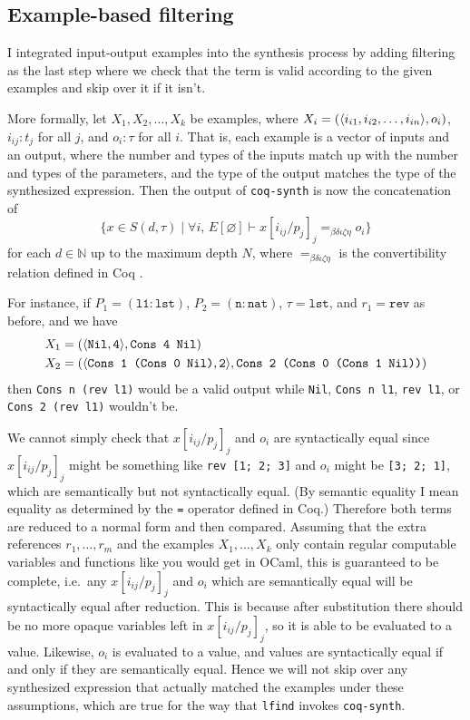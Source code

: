 \documentclass[11pt]{article}
\newcommand{\N}{\mathbb{N}}
\newcommand{\coq}[1]{\texttt{#1}}
\DeclarePairedDelimiter{\vect}{\langle}{\rangle}
\begin{document}
\subsection{Example-based filtering}

I integrated input-output examples into the synthesis process by adding filtering as the last step where we check that the term is valid according to the given examples and skip over it if it isn't.

More formally, let $X_1, X_2, \dots, X_k$ be examples, where $X_i = (\vect{i_{i1}, i_{i2}, \dots, i_{in}}, o_i)$, $i_{ij} : t_j$ for all $j$, and $o_i : \tau$ for all $i$. That is, each example is a vector of inputs and an output, where the number and types of the inputs match up with the number and types of the parameters, and the type of the output matches the type of the synthesized expression. Then the output of \texttt{coq-synth} is now the concatenation of
\[\{x \in S(d, \tau) \mid \forall i,\,E[\varnothing] \vdash x[i_{ij}/p_j]_j =_{\beta\delta\iota\zeta\eta} o_i\}\]
for each $d \in \N$ up to the maximum depth $N$, where $=_{\beta\delta\iota\zeta\eta}$ is the convertibility relation defined in Coq \cite{conversion}.

For instance, if $P_1 = (\coq{l1} : \coq{lst})$, $P_2 = (\coq{n} : \coq{nat})$, $\tau = \coq{lst}$, and $r_1 = \coq{rev}$ as before, and we have
\begin{align*}
    X_1 &= (\vect{\coq{Nil}, \coq{4}}, \coq{Cons 4 Nil}) \\
    X_2 &= (\vect{\coq{Cons 1 (Cons 0 Nil)}, \coq{2}}, \coq{Cons 2 (Cons 0 (Cons 1 Nil))})
\end{align*}
then \coq{Cons n (rev l1)} would be a valid output while \coq{Nil}, \coq{Cons n l1}, \coq{rev l1}, or \coq{Cons 2 (rev l1)} wouldn't be.

We cannot simply check that $x[i_{ij}/p_j]_j$ and $o_i$ are syntactically equal since $x[i_{ij}/p_j]_j$ might be something like \coq{rev [1; 2; 3]} and $o_i$ might be \coq{[3; 2; 1]}, which are semantically but not syntactically equal. (By semantic equality I mean equality as determined by the \coq{=} operator defined in Coq.) Therefore both terms are reduced to a normal form and then compared. Assuming that the extra references $r_1, \dots, r_m$ and the examples $X_1, \dots, X_k$ only contain regular computable variables and functions like you would get in OCaml, this is guaranteed to be complete, i.e.\ any $x[i_{ij}/p_j]_j$ and $o_i$ which are semantically equal will be syntactically equal after reduction. This is because after substitution there should be no more opaque variables left in $x[i_{ij}/p_j]_j$, so it is able to be evaluated to a value. Likewise, $o_i$ is evaluated to a value, and values are syntactically equal if and only if they are semantically equal. Hence we will not skip over any synthesized expression that actually matched the examples under these assumptions, which are true for the way that \texttt{lfind} invokes \texttt{coq-synth}.
\end{document}
